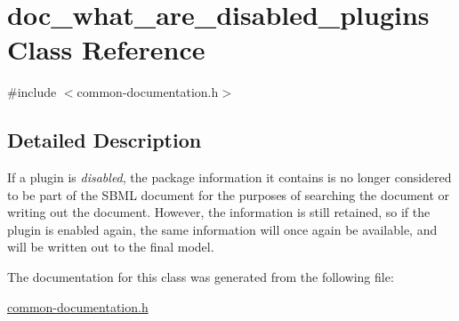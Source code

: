 \hypertarget{classdoc__what__are__disabled__plugins}{}\section{doc\+\_\+what\+\_\+are\+\_\+disabled\+\_\+plugins Class Reference}
\label{classdoc__what__are__disabled__plugins}


{\ttfamily \#include $<$common-\/documentation.\+h$>$}



\subsection{Detailed Description}
\begin{DoxyParagraph}{}
If a plugin is {\itshape disabled}, the package information it contains is no longer considered to be part of the S\+B\+ML document for the purposes of searching the document or writing out the document. However, the information is still retained, so if the plugin is enabled again, the same information will once again be available, and will be written out to the final model. 
\end{DoxyParagraph}


The documentation for this class was generated from the following file\+:\begin{DoxyCompactItemize}
\item 
\hyperlink{common-documentation_8h}{common-\/documentation.\+h}\end{DoxyCompactItemize}

